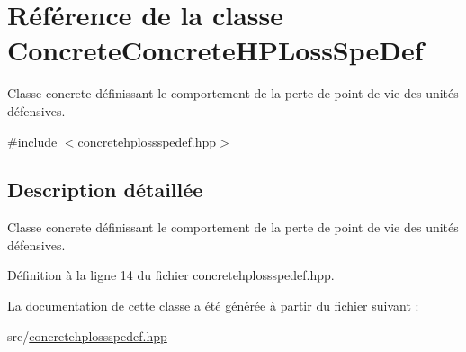 \hypertarget{classConcreteConcreteHPLossSpeDef}{\section{Référence de la classe Concrete\+Concrete\+H\+P\+Loss\+Spe\+Def}
\label{classConcreteConcreteHPLossSpeDef}
}


Classe concrete définissant le comportement de la perte de point de vie des unités défensives.  




{\ttfamily \#include $<$concretehplossspedef.\+hpp$>$}



\subsection{Description détaillée}
Classe concrete définissant le comportement de la perte de point de vie des unités défensives. 

Définition à la ligne 14 du fichier concretehplossspedef.\+hpp.



La documentation de cette classe a été générée à partir du fichier suivant \+:\begin{DoxyCompactItemize}
\item 
src/\hyperlink{concretehplossspedef_8hpp}{concretehplossspedef.\+hpp}\end{DoxyCompactItemize}
